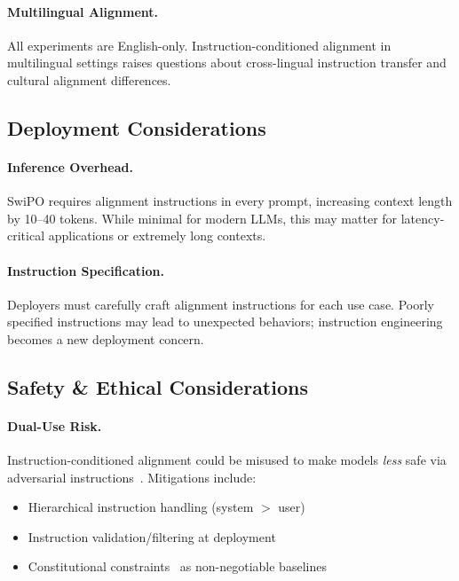 \paragraph{Multilingual Alignment.} All experiments are English-only. Instruction-conditioned alignment in multilingual settings raises questions about cross-lingual instruction transfer and cultural alignment differences.

\vspace{-2mm}
\subsection{Deployment Considerations}
\label{sec:deployment}

\paragraph{Inference Overhead.} SwiPO requires alignment instructions in every prompt, increasing context length by 10--40 tokens. While minimal for modern LLMs, this may matter for latency-critical applications or extremely long contexts.

\paragraph{Instruction Specification.} Deployers must carefully craft alignment instructions for each use case. Poorly specified instructions may lead to unexpected behaviors; instruction engineering becomes a new deployment concern.

\vspace{-2mm}
\subsection{Safety \& Ethical Considerations}
\label{sec:safety_ethics}

\paragraph{Dual-Use Risk.} Instruction-conditioned alignment could be misused to make models \textit{less} safe via adversarial instructions~\cite{zou2023universal,carlini2023aligned,pace2024west}. Mitigations include:
\begin{itemize}[leftmargin=*,itemsep=1pt]
    \item Hierarchical instruction handling (system $>$ user)
    \item Instruction validation/filtering at deployment
    \item Constitutional constraints~\cite{bai2022constitutional} as non-negotiable baselines
\end{itemize}

